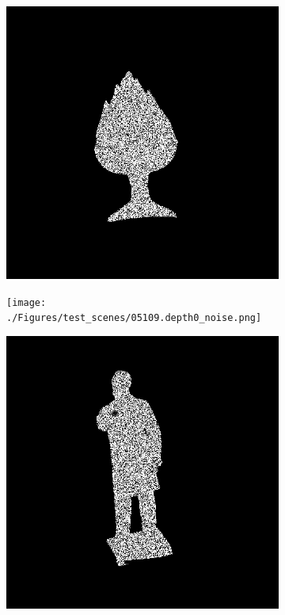 \documentclass[border=15pt, multi, tikz]{article}
\begin{document}
\begin{figure}[H]
	\begin{subfigure}[b]{0.18\linewidth}
	\includegraphics[width=\linewidth]{./Figures/test_scenes/05051.depth0_noise.png}
\end{subfigure}
\begin{subfigure}[b]{0.18\linewidth}
	\texttt{[image: ./Figures/test\_scenes/05109.depth0\_noise.png]}
\end{subfigure}
\begin{subfigure}[b]{0.18\linewidth}
	\includegraphics[width=\linewidth]{./Figures/test_scenes/05111.depth0_noise.png}

\end{subfigure}
\end{figure}
\end{document}
